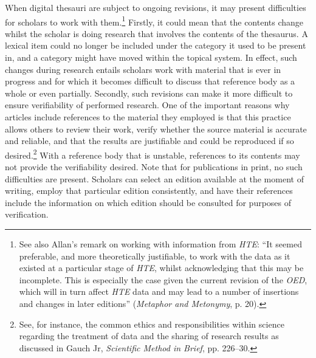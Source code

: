 When digital thesauri are subject to ongoing revisions, it may present difficulties for scholars to work with them.\footnote{See also Allan's remark on working with information from \textit{HTE}: ``It seemed preferable, and more theoretically justifiable, to work with the data as it existed at a particular stage of \textit{HTE}, whilst acknowledging that this may be incomplete. This is especially the case given the current revision of the \textit{OED}, which will in turn affect \textit{HTE} data and may lead to a number of insertions and changes in later editions'' (\textit{Metaphor and Metonymy}, p. 20).} Firstly, it could mean that the contents change whilst the scholar is doing research that involves the contents of the thesaurus. A lexical item could no longer be included under the category it used to be present in, and a category might have moved within the topical system. In effect, such changes during research entails scholars work with material that is ever in progress and for which it becomes difficult to discuss that reference body as a whole or even partially. Secondly, such revisions can make it more difficult to ensure verifiability of performed research. One of the important reasons why articles include references to the material they employed is that this practice allows others to review their work, verify whether the source material is accurate and reliable, and that the results are justifiable and could be reproduced if so desired.\footnote{See, for instance, the common ethics and responsibilities within science regarding the treatment of data and the sharing of research results as discussed in Gauch Jr, \textit{Scientific Method in Brief}, pp. 226–30.} With a reference body that is unstable, references to its contents may not provide the verifiability desired. Note that for publications in print, no such difficulties are present. Scholars can select an edition available at the moment of writing, employ that particular edition consistently, and have their references include the information on which edition should be consulted for purposes of verification.

